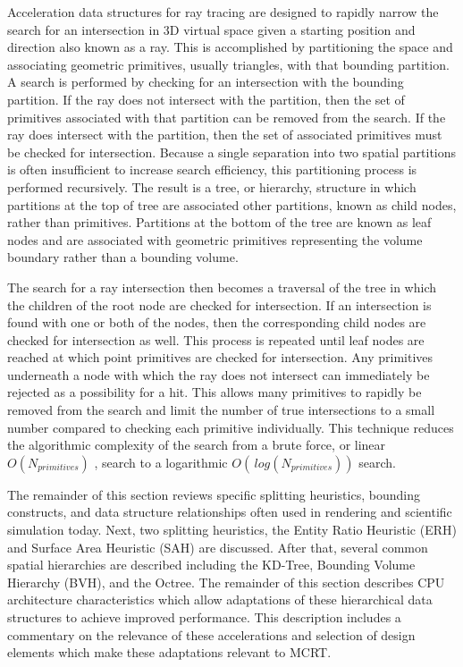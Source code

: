 Acceleration data structures for ray tracing are designed to rapidly narrow the
search for an intersection in 3D virtual space given a starting position and
direction also known as a ray. This is accomplished by partitioning the space
and associating geometric primitives, usually triangles, with that bounding
partition. A search is performed by checking for an intersection with the
bounding partition. If the ray does not intersect with the partition, then the
set of primitives associated with that partition can be removed from the
search. If the ray does intersect with the partition, then the set of associated
primitives must be checked for intersection. Because a single separation into
two spatial partitions is often insufficient to increase search efficiency, this
partitioning process is performed recursively. The result is a tree, or
hierarchy, structure in which partitions at the top of tree are associated other
partitions, known as child nodes, rather than primitives. Partitions at the
bottom of the tree are known as leaf nodes and are associated with geometric
primitives representing the volume boundary rather than a bounding volume.

The search for a ray intersection then becomes a traversal of the tree in which
the children of the root node are checked for intersection. If an intersection
is found with one or both of the nodes, then the corresponding child nodes are
checked for intersection as well. This process is repeated until leaf nodes are
reached at which point primitives are checked for intersection. Any primitives
underneath a node with which the ray does not intersect can immediately be
rejected as a possibility for a hit. This allows many primitives to rapidly be
removed from the search and limit the number of true intersections to a small
number compared to checking each primitive individually. This technique reduces
the algorithmic complexity of the search from a brute force, or linear
$O(N_{primitives})$ , search to a logarithmic $O(\, log(N_{primitives}))$
search.

The remainder of this section reviews specific splitting heuristics, bounding
constructs, and data structure relationships often used in rendering and
scientific simulation today. Next, two splitting heuristics, the Entity Ratio
Heuristic (ERH) and Surface Area Heuristic (SAH) are discussed. After that,
several common spatial hierarchies are described including the KD-Tree, Bounding
Volume Hierarchy (BVH), and the Octree. The remainder of this section describes
CPU architecture characteristics which allow adaptations of these hierarchical
data structures to achieve improved performance. This description includes a
commentary on the relevance of these accelerations and selection of design
elements which make these adaptations relevant to MCRT.

